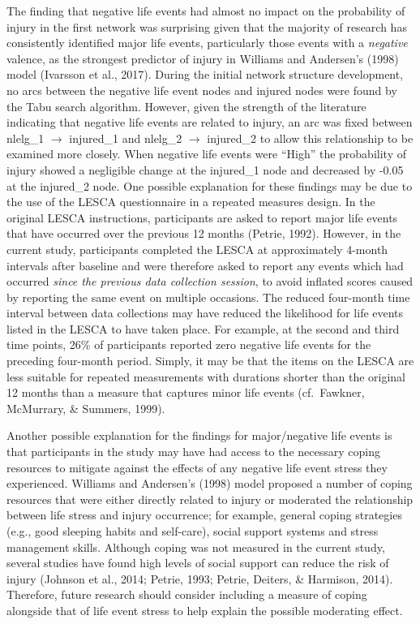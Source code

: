 \documentclass[man,floatsintext]{apa6}
\begin{document}
The finding that negative life events had almost no impact on the probability of injury in the first network was surprising given that the majority of research has consistently identified major life events, particularly those events with a \emph{negative} valence, as the strongest predictor of injury in Williams and Andersen's (1998) model (Ivarsson et al., 2017).
During the initial network structure development, no arcs between the negative life event nodes and injured nodes were found by the Tabu search algorithm.
However, given the strength of the literature indicating that negative life events are related to injury, an arc was fixed between nlelg\_1 \(\rightarrow\) injured\_1 and nlelg\_2 \(\rightarrow\) injured\_2 to allow this relationship to be examined more closely.
When negative life events were \enquote{High} the probability of injury showed a negligible change at the injured\_1 node and decreased by -0.05 at the injured\_2 node.
One possible explanation for these findings may be due to the use of the LESCA questionnaire in a repeated measures design.
In the original LESCA instructions, participants are asked to report major life events that have occurred over the previous 12 months (Petrie, 1992).
However, in the current study, participants completed the LESCA at approximately 4-month intervals after baseline and were therefore asked to report any events which had occurred \emph{since the previous data collection session}, to avoid inflated scores caused by reporting the same event on multiple occasions.
The reduced four-month time interval between data collections may have reduced the likelihood for life events listed in the LESCA to have taken place.
For example, at the second and third time points, 26\% of participants reported zero negative life events for the preceding four-month period.
Simply, it may be that the items on the LESCA are less suitable for repeated measurements with durations shorter than the original 12 months than a measure that captures minor life events (cf.~Fawkner, McMurrary, \& Summers, 1999).

Another possible explanation for the findings for major/negative life events is that participants in the study may have had access to the necessary coping resources to mitigate against the effects of any negative life event stress they experienced.
Williams and Andersen's (1998) model proposed a number of coping resources that were either directly related to injury or moderated the relationship between life stress and injury occurrence; for example, general coping strategies (e.g., good sleeping habits and self-care), social support systems and stress management skills.
Although coping was not measured in the current study, several studies have found high levels of social support can reduce the risk of injury (Johnson et al., 2014; Petrie, 1993; Petrie, Deiters, \& Harmison, 2014).
Therefore, future research should consider including a measure of coping alongside that of life event stress to help explain the possible moderating effect.
\end{document}
